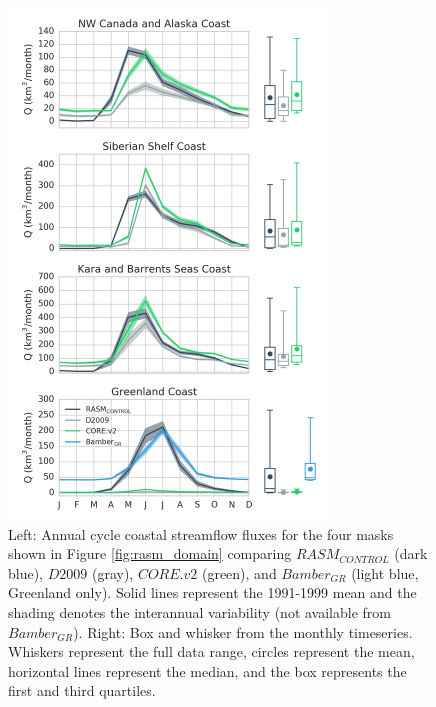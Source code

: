\documentclass[jgrga, draft]{agutex}
\begin{document}
\clearpage
\begin{figure}
\noindent\includegraphics[width=20pc,natwidth=1]{coastal_hydrographs}
\caption{Left: Annual cycle coastal streamflow fluxes for the four masks shown in Figure \ref{fig:rasm_domain} comparing $RASM_{CONTROL}$ (dark blue), $D2009$ (gray), $CORE.v2$ (green), and $Bamber_{GR}$ (light blue, Greenland only).
Solid lines represent the 1991-1999 mean and the shading denotes the interannual variability (not available from $Bamber_{GR}$).
Right: Box and whisker from the monthly timeseries.
Whiskers represent the full data range, circles represent the mean, horizontal lines represent the median, and the box represents the first and third quartiles.
}
\label{fig:coastal_hydrographs}
\end{figure}
\end{document}
